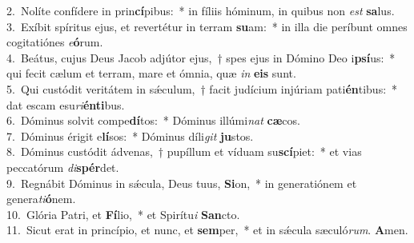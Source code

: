 {2.~}Nolíte confídere in prin\textbf{cí}pibus:~* in fíliis hóminum, in quibus non \textit{est} \textbf{sa}lus.\\
{3.~}Exíbit spíritus ejus, et revertétur in terram \textbf{su}am:~* in illa die períbunt omnes cogitatiónes \textit{e}\textbf{ó}rum.\\
{4.~}Beátus, cujus Deus Jacob adjútor ejus,~† spes ejus in Dómino Deo i\textbf{psí}us:~* qui fecit cælum et terram, mare et ómnia, quæ \textit{in} \textbf{e}\textbf{is} sunt.\\
{5.~}Qui custódit veritátem in sǽculum,~† facit judícium injúriam pati\textbf{én}tibus:~* dat escam esu\textit{ri}\textbf{én}\textbf{ti}bus.\\
{6.~}Dóminus solvit compe\textbf{dí}tos:~* Dóminus illúmi\textit{nat} \textbf{cæ}cos.\\
{7.~}Dóminus érigit e\textbf{lí}sos:~* Dóminus díli\textit{git} \textbf{ju}stos.\\
{8.~}Dóminus custódit ádvenas,~† pupíllum et víduam su\textbf{scí}piet:~* et vias peccatórum \textit{di}\textbf{spér}det.\\
{9.~}Regnábit Dóminus in sǽcula, Deus tuus, \textbf{Si}on,~* in generatiónem et genera\textit{ti}\textbf{ó}nem.\\
{10.~}Glória Patri, et \textbf{Fí}lio,~* et Spirítu\textit{i} \textbf{San}cto.\\
{11.~}Sicut erat in princípio, et nunc, et \textbf{sem}per,~* et in sǽcula sæculó\textit{rum}. \textbf{A}men.\\
